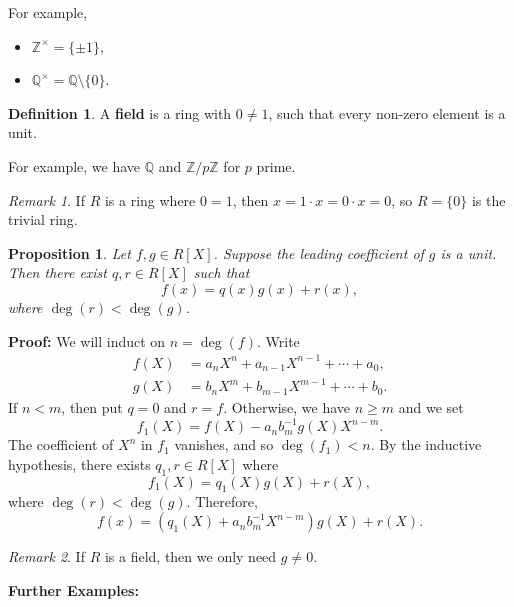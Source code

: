 \documentclass[12pt]{article}
\newtheorem{proposition}{Proposition}[section]
\theoremstyle{definition}
\newtheorem{definition}{Definition}[section]
\theoremstyle{remark}
\newtheorem*{remark}{Remark}
\begin{document}
For example,
\begin{itemize}
	\item $\mathbb{Z}^{\times} = \{\pm 1\}$,
	\item $\mathbb{Q}^{\times} = \mathbb{Q} \setminus \{0\}$.
\end{itemize}

\begin{definition}
	A \textbf{field} is a ring with $0 \neq 1$, such that every non-zero element is a unit.
\end{definition}

For example, we have $\mathbb{Q}$ and $\mathbb{Z} / p \mathbb{Z}$ for $p$ prime.

\begin{remark}
	If $R$ is a ring where $0 = 1$, then $x = 1 \cdot x = 0 \cdot x = 0$, so $R = \{0\}$ is the trivial ring.
\end{remark}

\begin{proposition}
	Let $f, g \in R[X]$. Suppose the leading coefficient of $g$ is a unit. Then there exist $q, r \in R[X]$ such that
	\[
		f(x) = q(x)g(x) + r(x)
	,\]
	where $\deg(r) < \deg(g)$.
\end{proposition}

\begin{adjustbox}{minipage = \columnwidth - 25.5pt, margin=1em, frame=1pt, margin=0em}
\textbf{Proof:} We will induct on $n = \deg(f)$. Write
\begin{align*}
	f(X) &= a_nX^{n} + a_{n-1}X^{n-1} + \cdots + a_0, \\
	g(X) &= b_nX^{m} + b_{m-1}X^{m-1} + \cdots + b_0.
\end{align*}
If $n < m$, then put $q = 0$ and $r = f$. Otherwise, we have $n \geq m$ and we set
\[
	f_1(X) = f(X) - a_nb_m^{-1}g(X)X^{n - m}
.\]
The coefficient of $X^{n}$ in $f_1$ vanishes, and so $\deg(f_1) < n$. By the inductive hypothesis, there exists $q_1, r \in R[X]$ where
\[
	f_1(X) = q_1(X)g(X) + r(X)
,\]
where $\deg(r) < \deg (g)$. Therefore,
\[
	f(x) = (q_1(X) + a_nb_m^{-1}X^{n - m})g(X) + r(X)
.\]
\end{adjustbox}

\begin{remark}
	If $R$ is a field, then we only need $g \neq 0$.
\end{remark}

\textbf{Further Examples:} 
\end{document}

